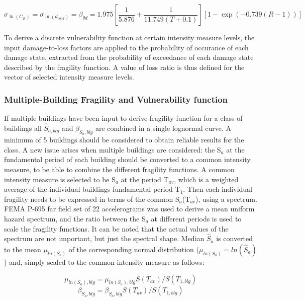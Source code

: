 \begin{equation}
\sigma_{\ln(C_R)} = \sigma_{\ln(d_{roof})} = \beta_{\theta d} =  1.975 [\frac{1}{5.876} + \frac{1}{11.749 (T + 0.1)}] [1- \exp(-0.739 (R - 1))]
\label{eq:beta_eq_RGM}
\end{equation}

To derive a discrete vulnerability function at certain intensity measure levels, the input damage-to-loss factors are applied to the probability of occurance of each damage state, extracted from the probability of exceedance of each damage state described by the fragility function. A value of loss ratio is thus defined for the vector of selected intensity measure levels.

\subsubsection{Multiple-Building Fragility and Vulnerability function}
\label{subsubsec:multiple-buildings}
If multiple buildings have been input to derive fragility function for a class of buildings all $\hat{S}_{a, blg}$ and $\beta_{S_a, blg}$ are combined in a single lognormal curve. A minimum of 5 buildings should be considered to obtain reliable results for the class. 
A new issue arises when multiple buildings are considered: the S$_a$ at the fundamental period of each building should be converted to a common intensity measure, to be able to combine the different fragility functions. A common intensity measure is selected to be S$_a$ at the period T$_{av}$, which is a weighted average of the individual buildings fundamental period T$_1$. Then each individual fragility needs to be expressed in terms of the common S$_a$(T$_{av}$), using a spectrum. FEMA P-695 far field set of 22 accelerograms was used to derive a mean uniform hazard spectrum, and the ratio between the S$_a$ at different periods is used to scale the fragility functions. It can be noted that the actual values of the spectrum are not important, but just the spectral shape. 
Median $\hat{S}_a$ is converted to the mean $\mu_{ln(S_a)}$ of the corresponding normal distribution ($\mu_{ln(S_a)} = ln(\hat{S}_a)$) and, simply scaled to the common intensity measure as follows:

\begin{equation}
\mu_{ln(S_a), blg} = \mu_{ln(S_a), blg} S(T_{av})/ S(T_{1, blg})
\end{equation}
\begin{equation}
\beta_{S_a, blg} = \beta_{S_a, blg} S(T_{av})/ S(T_{1, blg})
\label{eq:Sa(Tav)}
\end{equation}

